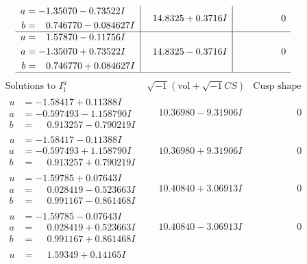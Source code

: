\documentclass[1p]{elsarticle_modified}
\theoremstyle{definition}
\newcommand{\I}{\sqrt{-1}}
\begin{document}
$$\begin{array}{c|c|c}
\begin{aligned}
a &= -1.35070 - 0.73522 I \\
b &= \phantom{-}0.746770 - 0.084627 I\end{aligned}
 & \phantom{-}14.8325 + 0.3716 I & \phantom{-0.000000 } 0 \\ \hline\begin{aligned}
u &= \phantom{-}1.57870 - 0.11756 I \\
a &= -1.35070 + 0.73522 I \\
b &= \phantom{-}0.746770 + 0.084627 I\end{aligned}
 & \phantom{-}14.8325 - 0.3716 I & \phantom{-0.000000 } 0\\
 \hline 
 \end{array}$$\newpage$$\begin{array}{c|c|c}  
\text{Solutions to }I^u_{1}& \I (\text{vol} + \sqrt{-1}CS) & \text{Cusp shape}\\
 \hline 
\begin{aligned}
u &= -1.58417 + 0.11388 I \\
a &= -0.597493 - 1.158790 I \\
b &= \phantom{-}0.913257 - 0.790219 I\end{aligned}
 & \phantom{-}10.36980 - 9.31906 I & \phantom{-0.000000 } 0 \\ \hline\begin{aligned}
u &= -1.58417 - 0.11388 I \\
a &= -0.597493 + 1.158790 I \\
b &= \phantom{-}0.913257 + 0.790219 I\end{aligned}
 & \phantom{-}10.36980 + 9.31906 I & \phantom{-0.000000 } 0 \\ \hline\begin{aligned}
u &= -1.59785 + 0.07643 I \\
a &= \phantom{-}0.028419 - 0.523663 I \\
b &= \phantom{-}0.991167 - 0.861468 I\end{aligned}
 & \phantom{-}10.40840 + 3.06913 I & \phantom{-0.000000 } 0 \\ \hline\begin{aligned}
u &= -1.59785 - 0.07643 I \\
a &= \phantom{-}0.028419 + 0.523663 I \\
b &= \phantom{-}0.991167 + 0.861468 I\end{aligned}
 & \phantom{-}10.40840 - 3.06913 I & \phantom{-0.000000 } 0 \\ \hline\begin{aligned}
u &= \phantom{-}1.59349 + 0.14165 I \\

\end{aligned}
\end{array}$$
\end{document}
